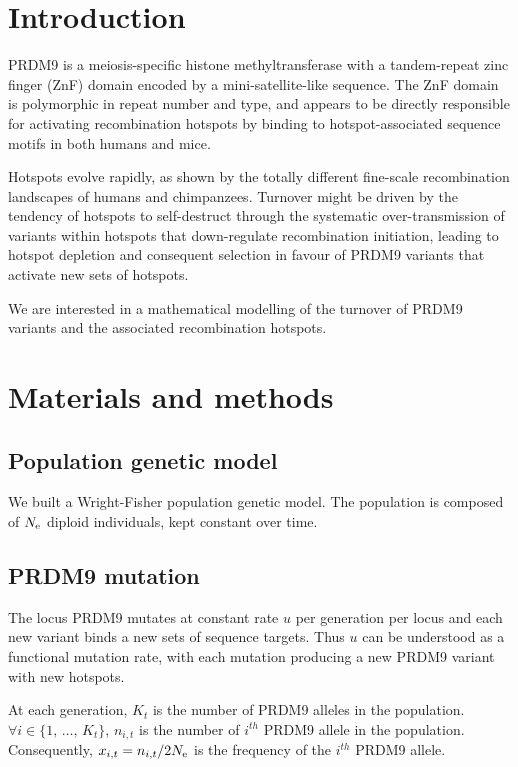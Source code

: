\documentclass{article}
\begin{document}
\section*{Introduction}
PRDM9 is a meiosis-specific histone methyltransferase with a tandem-repeat zinc finger (ZnF) domain encoded by a mini-satellite-like sequence. The ZnF domain is polymorphic in repeat number and type, and appears to be directly responsible for activating recombination hotspots by binding to hotspot-associated sequence motifs in both humans and mice.

Hotspots evolve rapidly, as shown by the totally different fine-scale recombination landscapes of humans and chimpanzees.
Turnover might be driven by the tendency of hotspots to self-destruct through the systematic over-transmission of variants within hotspots that down-regulate recombination initiation, leading to hotspot depletion and consequent 
selection in favour of PRDM9 variants that activate new sets of hotspots.

We are interested in a mathematical modelling of the turnover of PRDM9 variants and the associated recombination hotspots.

\section*{Materials and methods}

\subsection*{Population genetic model}

We built a Wright-Fisher population genetic model.
The population is composed of $N_\mathrm{e}$ diploid individuals, kept constant over time.

\subsection*{PRDM9 mutation}

The locus PRDM9 mutates at constant rate $u$ per generation per locus and each new variant binds a new sets of sequence targets. Thus $u$ can be understood as a functional mutation rate, with each mutation producing a new PRDM9 variant with new hotspots.

At each generation, $K_{t}$ is the number of PRDM9 alleles in the population. $\forall i \in \{ 1, \, \dots, \, K_{t} \}$, $n_{i,t}$ is the number of $i^{th}$ PRDM9 allele in the population. Consequently, $x_{i,t} = n_{i,t} / 2 N_\mathrm{e}$ is the frequency of the $i^{th}$ PRDM9 allele.
\end{document}
